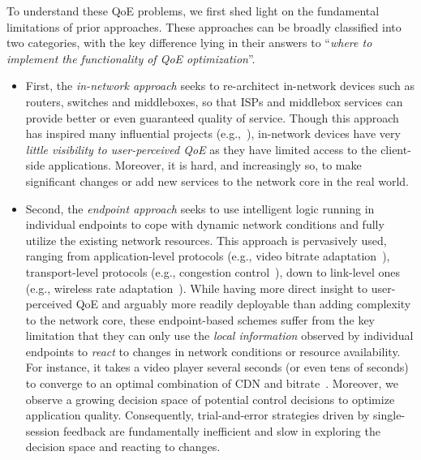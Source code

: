 To understand these QoE problems, we first shed light on
the fundamental limitations of prior approaches. 
These approaches can be broadly classified 
into two categories, with the key difference lying in their answers to
``{\em where to implement the functionality of QoE optimization}''.



\begin{itemize}
\item First, the {\em in-network approach} 
seeks to re-architect in-network devices such as routers, switches
and middleboxes, so that ISPs and middlebox services can provide
better or even guaranteed quality of service. 
Though this approach has inspired many influential projects 
(e.g.,~\cite{demers1989analysis,csfq,active-network}),
in-network devices have very {\em little visibility to user-perceived QoE}
as they have limited access to the client-side applications.
Moreover, it is hard, and increasingly so, to make significant changes 
or add new services to the network core in the real world. 

\item Second, the {\em endpoint approach} seeks to use
intelligent logic running in individual endpoints to cope with dynamic
network conditions and fully utilize the existing network resources.
This approach is pervasively used, ranging from
application-level protocols (e.g., video bitrate adaptation~\cite{dash}),
transport-level protocols (e.g., congestion control~\cite{jacobson1988congestion}),
down to link-level ones (e.g., wireless rate adaptation~\cite{holland2001rate}).
While having more direct insight to user-perceived QoE and arguably
more readily deployable than adding complexity to the network core, 
these endpoint-based schemes suffer from the key limitation 
that they can only use the 
{\em local information} observed by individual endpoints to
{\em react} to changes in network conditions or resource availability.
For instance, it takes a video player several seconds (or even tens of seconds)
to converge to an optimal combination of CDN and 
bitrate~\cite{dda-report}.
Moreover, we observe a growing decision space of potential control decisions 
to optimize application quality.
Consequently, trial-and-error strategies driven by single-session feedback are
fundamentally inefficient and slow in exploring the decision space and reacting to
changes. 


\end{itemize}
